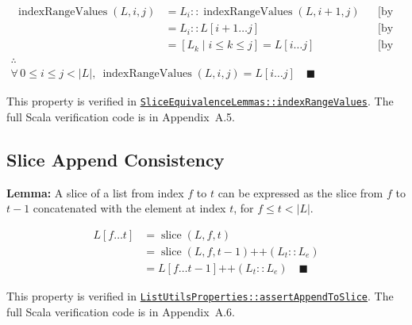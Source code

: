 \begin{gather*}
\begin{aligned}
\operatorname{indexRangeValues}(L, i, j) &= L_i :: \operatorname{indexRangeValues}(L, i + 1, j) && \text{[by definition]} \\
&= L_i :: L[i + 1 \dots j] && \text{[by Inductive Hypothesis]} \\
&= [ L_k \mid i \leq k \leq j ] = L[i \dots j] && \text{[by specification]}
\end{aligned} \\
\therefore \\
\forall\, 0 \leq i \leq j < |L|,\ \operatorname{indexRangeValues}(L, i, j) = L[i \dots j]
\quad \blacksquare
\end{gather*}

{\raggedright
This property is verified in
\href{https://github.com/thiagomata/prime-numbers/blob/list-article-v1.0.0/src/main/scala/v1/chapter3/list/properties/SliceEquivalenceLemmas.scala}{\texttt{SliceEquivalenceLemmas::\allowbreak indexRangeValues}}.
The full Scala verification code is in Appendix~A.5.
\par}

\subsection{Slice Append Consistency}

\textbf{Lemma:} A slice of a list from index $f$ to $t$ can be expressed
as the slice from $f$ to $t - 1$ concatenated with the element at index
$t$, for $f \le t < |L|$.

\begin{equation*}
\begin{aligned}
L[f \dots t] &= \operatorname{slice}(L, f, t) \\
             &= \operatorname{slice}(L, f, t - 1) \mathbin{\texttt{++}} (L_t :: L_e) \\
             &= L[f \dots t - 1] \mathbin{\texttt{++}} (L_t :: L_e) \quad \blacksquare
\end{aligned}
\end{equation*}

{\raggedright
This property is verified in
\href{https://github.com/thiagomata/prime-numbers/blob/list-article-v1.0.0/src/main/scala/v1/chapter3/list/properties/ListUtilsProperties.scala}{\texttt{ListUtilsProperties::\allowbreak assertAppendToSlice}}.
The full Scala verification code is in Appendix~A.6.
\par}
